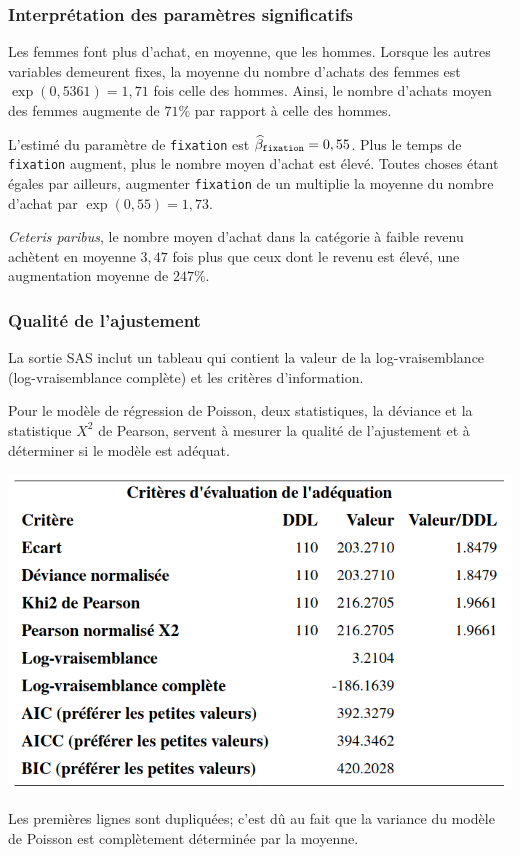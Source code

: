 \documentclass{beamer}
\begin{document}
\begin{frame}[fragile]
\frametitle{Interprétation des paramètres significatifs}
\bi
\item Les femmes font plus d'achat, en moyenne, que les hommes. Lorsque les autres
variables demeurent fixes, la moyenne du nombre d'achats des femmes est
$\exp(0,5361) = 1,71$ fois celle des hommes. Ainsi, le nombre d'achats moyen
des femmes augmente de $71$\% par rapport à  celle des hommes.
\item L'estimé du paramètre de \texttt{fixation} est $\widehat{\beta}_{\texttt{fixation}}=0,55$. Plus le temps de \texttt{fixation} augment, plus le nombre moyen d'achat est
élevé. Toutes choses étant égales par ailleurs, augmenter
\texttt{fixation} de un multiplie la moyenne du nombre d'achat par $\exp(0,55) =
1,73$.
\item \textit{Ceteris paribus}, le nombre moyen d'achat dans la catégorie à faible revenu achètent en moyenne $3,47$ fois plus que ceux dont le revenu est élevé, une augmentation moyenne de $247$\%.
\ei
\end{frame}
\begin{frame}
 \frametitle{Qualité de l'ajustement}
 {\small 
\bi \item  La sortie SAS inclut un tableau qui contient la valeur de la log-vraisemblance (log-vraisemblance complète) et les critères d'information. 
\item Pour le modèle de régression de Poisson, deux statistiques, la déviance et la statistique $X^2$ de Pearson, servent à mesurer la qualité de l'ajustement et à déterminer si le modèle est adéquat.
\ei
}
\begin{center}
 \includegraphics[width = 0.7\linewidth]{img/c4/diapos8-e3}
 \end{center}
 {\tiny
 Les premières lignes sont dupliquées; c'est dû au fait que la variance du modèle de Poisson est complètement déterminée par la moyenne.
 
 }
\end{frame}
\end{document}
